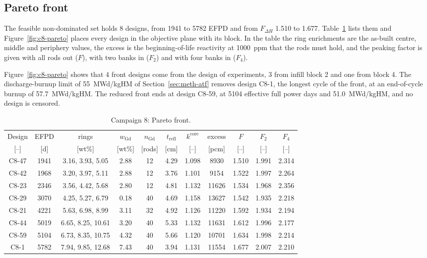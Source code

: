 \subsection{Pareto front}
\label{sec:res-c8-front}

The feasible non-dominated set holds 8 designs, from 1941 to 5782
EFPD and from $F_{\Delta H}$ 1.510 to 1.677. Table~\ref{tab:c8-front}
lists them and Figure~\ref{fig:c8-pareto} places every design in the
objective plane with its block. In the table the ring enrichments are
the as-built centre, middle and periphery values, the excess is the
beginning-of-life reactivity at \SI{1000}{ppm} that the rods must hold,
and the peaking factor is given with all rods out ($F$), with two banks
in ($F_2$) and with four banks in ($F_4$).

Figure~\ref{fig:c8-pareto} shows that 4 front designs come from the
design of experiments, 3 from infill block 2 and one from block 4.
The discharge-burnup limit of \SI{55}{MWd/kgHM} of
Section~\ref{sec:meth-atf} removes design C8-1, the longest cycle of the front, at an end-of-cycle burnup
of \SI{57.7}{MWd/kgHM}. The reduced front ends at design C8-59, at
\num{5104} effective full power days and \SI{51.0}{MWd/kgHM}, and no
design is censored.

\begin{table}[htbp]
  \centering
  \small
  \caption{Campaign 8: Pareto front.}
  \label{tab:c8-front}
  \setlength{\tabcolsep}{3.4pt}
  \begin{tabular}{ccccccccccc}
    \toprule
    Design & EFPD & rings & $w_\mathrm{Gd}$ & $n_\mathrm{Gd}$ &
      $t_\mathrm{refl}$ & $k^\mathrm{core}$ & excess & $F$ & $F_{2}$ &
      $F_{4}$ \\
    {[--]} & [d] & [wt\%] & [wt\%] & [rods] & [cm] & [--] & [pcm] &
      [--] & [--] & [--] \\
    \midrule
    C8-47 & 1941 & 3.16, 3.93, 5.05  & 2.88 & 12 & 4.29 & 1.098 &  8930 & 1.510 & 1.991 & 2.314 \\
    C8-42 & 1968 & 3.20, 3.97, 5.11  & 2.88 & 12 & 3.76 & 1.101 &  9154 & 1.522 & 1.997 & 2.264 \\
    C8-23 & 2346 & 3.56, 4.42, 5.68  & 2.80 & 12 & 4.81 & 1.132 & 11626 & 1.534 & 1.968 & 2.356 \\
    C8-29 & 3070 & 4.25, 5.27, 6.79  & 0.18 & 40 & 4.69 & 1.158 & 13627 & 1.542 & 1.935 & 2.218 \\
    C8-21 & 4221 & 5.63, 6.98, 8.99  & 3.11 & 32 & 4.92 & 1.126 & 11220 & 1.592 & 1.934 & 2.194 \\
    C8-44 & 5019 & 6.65, 8.25, 10.61 & 3.20 & 40 & 5.33 & 1.132 & 11631 & 1.612 & 1.996 & 2.177 \\
    C8-59 & 5104 & 6.73, 8.35, 10.75 & 4.32 & 40 & 5.66 & 1.120 & 10701 & 1.634 & 1.998 & 2.214 \\
     C8-1 & 5782 & 7.94, 9.85, 12.68 & 7.43 & 40 & 3.94 & 1.131 & 11554 & 1.677 & 2.007 & 2.210 \\
    \bottomrule
  \end{tabular}
\end{table}

